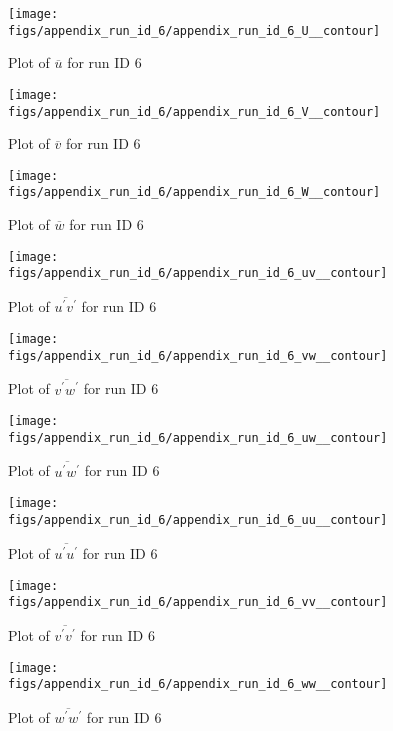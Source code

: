 \begin{figure}[H]
\centering
\texttt{[image: figs/appendix\_run\_id\_6/appendix\_run\_id\_6\_U\_\_contour]}
\caption{Plot of $\overline{u}$ for run ID 6}
\label{fig:appendix_run_id_6_U__contour}
\end{figure}


\begin{figure}[H]
\centering
\texttt{[image: figs/appendix\_run\_id\_6/appendix\_run\_id\_6\_V\_\_contour]}
\caption{Plot of $\overline{v}$ for run ID 6}
\label{fig:appendix_run_id_6_V__contour}
\end{figure}


\begin{figure}[H]
\centering
\texttt{[image: figs/appendix\_run\_id\_6/appendix\_run\_id\_6\_W\_\_contour]}
\caption{Plot of $\overline{w}$ for run ID 6}
\label{fig:appendix_run_id_6_W__contour}
\end{figure}


\begin{figure}[H]
\centering
\texttt{[image: figs/appendix\_run\_id\_6/appendix\_run\_id\_6\_uv\_\_contour]}
\caption{Plot of $\overline{u^\prime v^\prime}$ for run ID 6}
\label{fig:appendix_run_id_6_uv__contour}
\end{figure}


\begin{figure}[H]
\centering
\texttt{[image: figs/appendix\_run\_id\_6/appendix\_run\_id\_6\_vw\_\_contour]}
\caption{Plot of $\overline{v^\prime w^\prime}$ for run ID 6}
\label{fig:appendix_run_id_6_vw__contour}
\end{figure}


\begin{figure}[H]
\centering
\texttt{[image: figs/appendix\_run\_id\_6/appendix\_run\_id\_6\_uw\_\_contour]}
\caption{Plot of $\overline{u^\prime w^\prime}$ for run ID 6}
\label{fig:appendix_run_id_6_uw__contour}
\end{figure}


\begin{figure}[H]
\centering
\texttt{[image: figs/appendix\_run\_id\_6/appendix\_run\_id\_6\_uu\_\_contour]}
\caption{Plot of $\overline{u^\prime u^\prime}$ for run ID 6}
\label{fig:appendix_run_id_6_uu__contour}
\end{figure}


\begin{figure}[H]
\centering
\texttt{[image: figs/appendix\_run\_id\_6/appendix\_run\_id\_6\_vv\_\_contour]}
\caption{Plot of $\overline{v^\prime v^\prime}$ for run ID 6}
\label{fig:appendix_run_id_6_vv__contour}
\end{figure}


\begin{figure}[H]
\centering
\texttt{[image: figs/appendix\_run\_id\_6/appendix\_run\_id\_6\_ww\_\_contour]}
\caption{Plot of $\overline{w^\prime w^\prime}$ for run ID 6}
\label{fig:appendix_run_id_6_ww__contour}
\end{figure}


